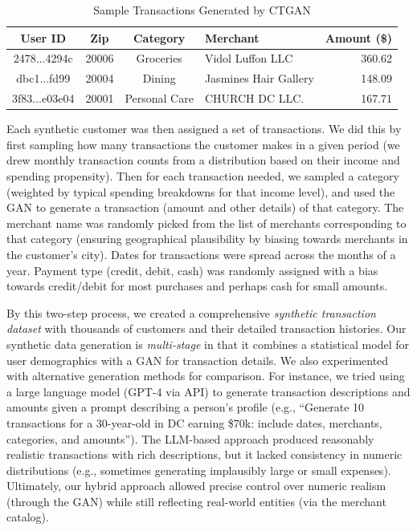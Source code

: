 \documentclass{scrartcl}
\begin{document}
\begin{table}[ht]
\centering
\caption{Sample Transactions Generated by CTGAN}
\label{tab:ctgan_transactions}
\begin{tabular}{|c|c|c|l|r|}
\hline
\textbf{User ID} & \textbf{Zip} & \textbf{Category} & \textbf{Merchant} & \textbf{Amount (\$)} \\
\hline
2478...4294c & 20006 & Groceries & Vidol Luffon LLC & 360.62 \\
dbc1...fd99 & 20004 & Dining & Jasmines Hair Gallery & 148.09 \\
3f83...e03e04 & 20001 & Personal Care & CHURCH DC LLC. & 167.71 \\
\hline
\end{tabular}
\end{table}

Each synthetic customer was then assigned a set of transactions. We did this by first sampling how many transactions the customer makes in a given period (we drew monthly transaction counts from a distribution based on their income and spending propensity). Then for each transaction needed, we sampled a category (weighted by typical spending breakdowns for that income level), and used the GAN to generate a transaction (amount and other details) of that category. The merchant name was randomly picked from the list of merchants corresponding to that category (ensuring geographical plausibility by biasing towards merchants in the customer's city). Dates for transactions were spread across the months of a year. Payment type (credit, debit, cash) was randomly assigned with a bias towards credit/debit for most purchases and perhaps cash for small amounts.

By this two-step process, we created a comprehensive \textit{synthetic transaction dataset} with thousands of customers and their detailed transaction histories. Our synthetic data generation is \textit{multi-stage} in that it combines a statistical model for user demographics with a GAN for transaction details. We also experimented with alternative generation methods for comparison. For instance, we tried using a large language model (GPT-4 via API) to generate transaction descriptions and amounts given a prompt describing a person's profile (e.g., “Generate 10 transactions for a 30-year-old in DC earning \$70k: include dates, merchants, categories, and amounts”). The LLM-based approach produced reasonably realistic transactions with rich descriptions, but it lacked consistency in numeric distributions (e.g., sometimes generating implausibly large or small expenses). Ultimately, our hybrid approach allowed precise control over numeric realism (through the GAN) while still reflecting real-world entities (via the merchant catalog). 
\end{document}
